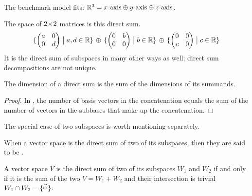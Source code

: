 \begin{example}
The benchmark model fits: 
$\mathbb{R}^3=\text{$x$-axis}\oplus\text{$y$-axis}\oplus\text{$z$-axis}$. 
\end{example}

\begin{example}
The space of \( 2 \! \times \! 2 \) matrices is this direct sum.
\begin{equation*}
  \mbox{$\{\begin{pmatrix}
         a  &0  \\
         0  &d
       \end{pmatrix}  \bigm| a,d\in\mathbb{R} \}$}
  \,\mbox{}\oplus\mbox{}\,
  \mbox{$\{\begin{pmatrix}
         0  &b  \\
         0  &0
       \end{pmatrix}  \bigm| b\in\mathbb{R} \}$}
  \,\mbox{}\oplus\mbox{}\,
  \mbox{$\{\begin{pmatrix}
         0  &0  \\
         c  &0
       \end{pmatrix}  \bigm| c\in\mathbb{R} \}$}
\end{equation*}
It is the direct sum of subspaces in many other ways as well; 
direct sum decompositions are not unique.
\end{example}

\begin{corollary} \label{cor:DirSumDimsAdd}
The dimension of a direct sum is the sum of the dimensions of its summands.
\end{corollary}

\begin{proof}
In ,
the number of basis vectors in the concatenation equals the sum of
the number of vectors in the subbases that make up the concatenation.
\end{proof}

The special case of two subspaces is worth mentioning separately.

\begin{definition}
When a vector space is the direct sum of two of its subspaces, then they are
said to be .%
\end{definition}

\begin{lemma}
\label{le:DirectSumTwoSp}
A vector space \( V \) is the 
direct sum
of two of its subspaces \( W_1 \) and \( W_2 \) if and only if it is the
sum of the two \( V=W_1+W_2 \) and their intersection is trivial
\( W_1\cap W_2=\mbox{$\{\vec{0}\,\}$} \).
\end{lemma}

